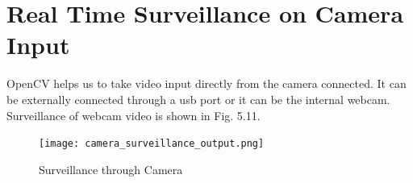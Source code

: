 \section{Real Time Surveillance on Camera Input}
OpenCV\cite{opencv} helps us to take video input directly from the camera connected. It can be externally connected through a usb port or it can be the internal webcam. Surveillance of webcam video is shown in Fig. 5.11.
\begin{figure}[H]
\centering
\texttt{[image: camera\_surveillance\_output.png]}
\caption{Surveillance through Camera}
\end{figure}

